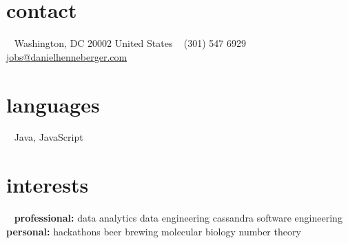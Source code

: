 \documentclass[]{friggeri-cv} %
\begin{document}


\begin{aside} %
\section{contact}
~
Washington, DC 20002
United States
~
(301) 547 6929
~
{\fontsize{8pt}{10pt}\selectfont\href{mailto:jobs@danielhenneberger.com}{jobs@danielhenneberger.com}}
\section{languages}
~
Java, JavaScript
\section{interests}
~
\textbf{professional:}
data analytics
data engineering
cassandra
software engineering
~
\textbf{personal:}
hackathons
beer brewing
molecular biology
number theory
\end{aside}

\end{document}
